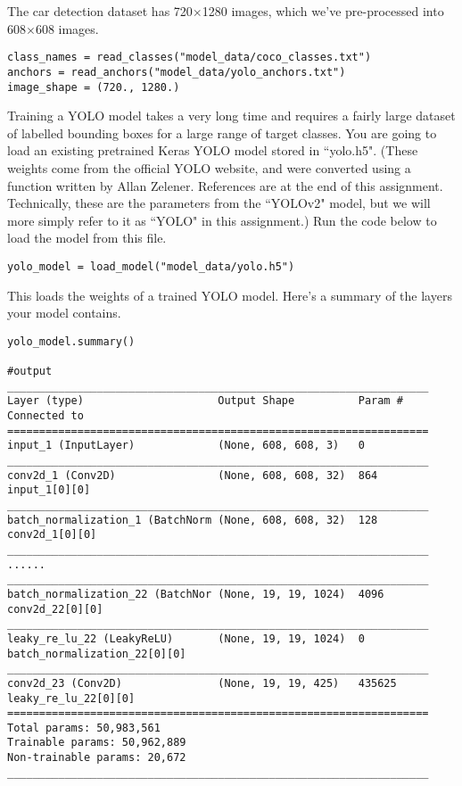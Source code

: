 The car detection dataset has 720$\times$1280 images, which we've pre-processed into 608$\times$608 images.
\begin{verbatim}
class_names = read_classes("model_data/coco_classes.txt")
anchors = read_anchors("model_data/yolo_anchors.txt")
image_shape = (720., 1280.)    
\end{verbatim}

Training a YOLO model takes a very long time and requires a fairly large dataset of labelled bounding boxes for a large range of target classes. You are going to load an existing pretrained Keras YOLO model stored in ``yolo.h5". (These weights come from the official YOLO website, and were converted using a function written by Allan Zelener. References are at the end of this assignment. Technically, these are the parameters from the ``YOLOv2" model, but we will more simply refer to it as ``YOLO" in this assignment.) Run the code below to load the model from this file.
\begin{verbatim}
yolo_model = load_model("model_data/yolo.h5")
\end{verbatim}

This loads the weights of a trained YOLO model. Here's a summary of the layers your model contains.
\begin{verbatim}
yolo_model.summary()

#output
__________________________________________________________________
Layer (type)                     Output Shape          Param #     Connected to                     
==================================================================
input_1 (InputLayer)             (None, 608, 608, 3)   0                                            
__________________________________________________________________
conv2d_1 (Conv2D)                (None, 608, 608, 32)  864         input_1[0][0]                    
__________________________________________________________________
batch_normalization_1 (BatchNorm (None, 608, 608, 32)  128         conv2d_1[0][0]                   
__________________________________________________________________
......
__________________________________________________________________
batch_normalization_22 (BatchNor (None, 19, 19, 1024)  4096        conv2d_22[0][0]                  
__________________________________________________________________
leaky_re_lu_22 (LeakyReLU)       (None, 19, 19, 1024)  0           batch_normalization_22[0][0]     
__________________________________________________________________
conv2d_23 (Conv2D)               (None, 19, 19, 425)   435625      leaky_re_lu_22[0][0]             
==================================================================
Total params: 50,983,561
Trainable params: 50,962,889
Non-trainable params: 20,672
__________________________________________________________________
\end{verbatim}

